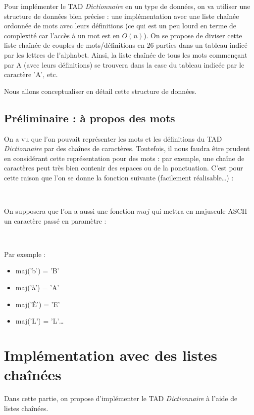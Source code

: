 \documentclass[a4paper, titlepage]{livret} %
\begin{document}
			Pour implémenter le TAD \textit{Dictionnaire} en un type de données, on va utiliser une structure de données bien précise :
			une implémentation avec une liste chaînée ordonnée de mots avec leurs définitions (ce qui est un peu lourd en terme de complexité car l'accès à un mot est en $O(n)$). 
			On se propose de diviser cette liste chaînée de couples de mots/définitions en 26 parties dans un tableau indicé par les lettres de l'alphabet.
			Ainsi, la liste chaînée de tous les mots commençant par A (avec leurs définitions) se trouvera dans la case du tableau indicée par le caractère 'A', etc.

			Nous allons conceptualiser en détail cette structure de données.

		\section{Préliminaire : à propos des mots}
			On a vu que l'on pouvait représenter les mots et les définitions du TAD \textit{Dictionnaire} par des chaînes de caractères.
			Toutefois, il nous faudra être prudent en considérant cette représentation pour des mots : par exemple, une chaîne de caractères peut très bien contenir des espaces ou de la ponctuation.
			C'est pour cette raison que l'on se donne la fonction suivante (facilement réalisable…) :\\
			\begin{algorithme}
				\\
			\end{algorithme}

			On supposera que l'on a aussi une fonction $maj$ qui mettra en majuscule ASCII un caractère passé en paramètre :\\
			\begin{algorithme}
				\signatureFonction{maj}{c : \caractere}{\caractere}\\
			\end{algorithme}

			Par exemple : 
			\begin{itemize}
				\item maj('b') = 'B'
				\item maj('à') = 'A'
				\item maj('É') = 'E'
				\item maj('L') = 'L'…
			\end{itemize}


	\chapter{Implémentation avec des listes chaînées}
		Dans cette partie, on propose d'implémenter le TAD \textit{Dictionnaire} à l'aide de listes chaînées.
\end{document}
